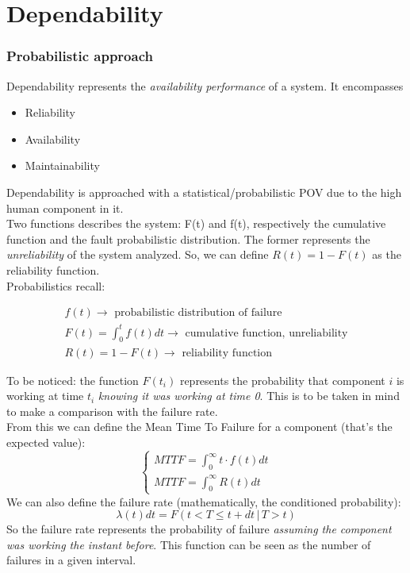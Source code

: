 \documentclass{article}
\begin{document}
	\clearpage \part{Dependability}
		\section{Probabilistic approach}
			Dependability represents the \emph{availability performance} of a system. It encompasses 
			\begin{itemize}
				\item Reliability
				\item Availability
				\item Maintainability
			\end{itemize}
			
			Dependability is approached with a statistical/probabilistic POV due to the high human component in it.\\
			Two functions describes the system: F(t) and f(t), respectively the cumulative function and the fault probabilistic distribution. The former represents the \emph{unreliability} of the system analyzed. So, we can define $R(t) =  1 - F(t)$ as the reliability function.\\
			Probabilistics recall:

			\begin{align}
				f(t) \rightarrow \text{ probabilistic distribution of failure}\\
				F(t) = \int_{0}^{t}f(t)dt \rightarrow \text{ cumulative function, unreliability}\\
				R(t) = 1 - F(t) \rightarrow \text{ reliability function}
			\end{align}

			To be noticed: the function $F(t_i)$ represents the probability that component $i$ is working at time $t_i$ \emph{knowing it was working at time 0}. This is to be taken in mind to make a comparison with the failure rate.\\
			From this we can define the Mean Time To Failure for a component (that's the expected value):
			\begin{equation}
				\begin{cases}
					MTTF = \int_0^{\infty}t \cdot f(t)dt\\
					MTTF = \int_0^{\infty}R(t)dt
				\end{cases}
			\end{equation}
			We can also define the failure rate (mathematically, the conditioned probability):
			\begin{equation}
				\lambda(t)dt = F(t < T \leq t+dt \,\vert\, T > t)
			\end{equation}
			So the failure rate represents the probability of failure \emph{assuming the component was working the instant before}. This function can be seen as the number of failures in a given interval.
			
\end{document}
